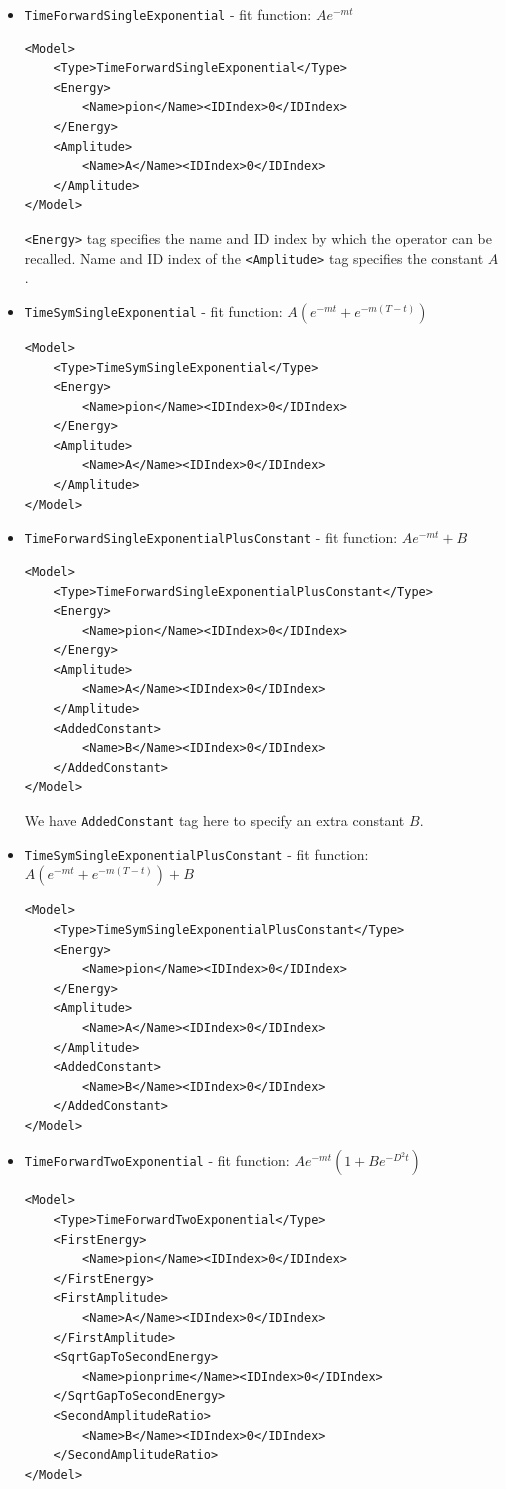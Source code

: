 \documentclass[12pt]{article}
\newcommand{\vb}{\texttt}
\begin{document}
\begin{itemize}
\item \vb{TimeForwardSingleExponential} - fit function: $A e^{-mt}$
\begin{verbatim}
<Model>
    <Type>TimeForwardSingleExponential</Type>
    <Energy>
        <Name>pion</Name><IDIndex>0</IDIndex>
    </Energy>
    <Amplitude>
        <Name>A</Name><IDIndex>0</IDIndex>
    </Amplitude>
</Model>
\end{verbatim}
\vb{<Energy>} tag specifies the name and ID index by which the operator can be recalled.
Name and ID index of the \vb{<Amplitude>} tag specifies the constant $A$ .

\item \vb{TimeSymSingleExponential} - fit function:
  $A(e^{-mt} + e^{-m(T-t)})$
\begin{verbatim}
<Model>
    <Type>TimeSymSingleExponential</Type>
    <Energy>
        <Name>pion</Name><IDIndex>0</IDIndex>
    </Energy>
    <Amplitude>
        <Name>A</Name><IDIndex>0</IDIndex>
    </Amplitude>
</Model>
\end{verbatim}

\item \vb{TimeForwardSingleExponentialPlusConstant} - fit function:
  $A e^{-mt} + B$
\begin{verbatim}
<Model>
    <Type>TimeForwardSingleExponentialPlusConstant</Type>
    <Energy>
        <Name>pion</Name><IDIndex>0</IDIndex>
    </Energy>
    <Amplitude>
        <Name>A</Name><IDIndex>0</IDIndex>
    </Amplitude>
    <AddedConstant>
        <Name>B</Name><IDIndex>0</IDIndex>
    </AddedConstant>
</Model>
\end{verbatim}

We have \vb{AddedConstant} tag here to specify an extra constant $B$.

\item \vb{TimeSymSingleExponentialPlusConstant} - fit function:
  $A (e^{-mt} + e^{-m(T-t)} ) + B$
\begin{verbatim}
<Model>
    <Type>TimeSymSingleExponentialPlusConstant</Type>
    <Energy>
        <Name>pion</Name><IDIndex>0</IDIndex>
    </Energy>
    <Amplitude>
        <Name>A</Name><IDIndex>0</IDIndex>
    </Amplitude>
    <AddedConstant>
        <Name>B</Name><IDIndex>0</IDIndex>
    </AddedConstant>
</Model>
\end{verbatim}

\item \vb{TimeForwardTwoExponential} - fit function:
  $A e^{-mt}(1 + B e^{-D^2t})$
\begin{verbatim}
<Model>
    <Type>TimeForwardTwoExponential</Type>
    <FirstEnergy>
        <Name>pion</Name><IDIndex>0</IDIndex>
    </FirstEnergy>
    <FirstAmplitude>
        <Name>A</Name><IDIndex>0</IDIndex>
    </FirstAmplitude>
    <SqrtGapToSecondEnergy>
        <Name>pionprime</Name><IDIndex>0</IDIndex>
    </SqrtGapToSecondEnergy>
    <SecondAmplitudeRatio>
        <Name>B</Name><IDIndex>0</IDIndex>
    </SecondAmplitudeRatio>
</Model>
\end{verbatim}


\end{itemize}
\end{document}
